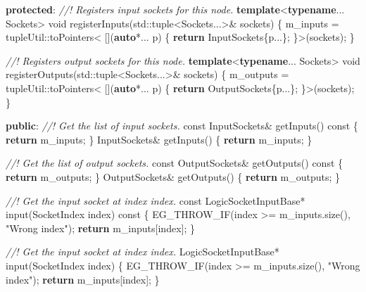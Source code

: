 \documentclass[
  12pt,
  british,
  a4paper,
  twoside,
  titlepage,
  openright,
  numbers=noenddot,
  chapterprefix=true,
  headings=optiontohead,
  svgnames,
  dvipsnames]{scrreprt}
\newenvironment{Shaded}{}{}
\newcommand{\AttributeTok}[1]{\textcolor[rgb]{0.49,0.56,0.16}{#1}}
\newcommand{\BuiltInTok}[1]{#1}
\newcommand{\CommentTok}[1]{\textcolor[rgb]{0.38,0.63,0.69}{\textit{#1}}}
\newcommand{\ControlFlowTok}[1]{\textcolor[rgb]{0.00,0.44,0.13}{\textbf{#1}}}
\newcommand{\DataTypeTok}[1]{\textcolor[rgb]{0.56,0.13,0.00}{#1}}
\newcommand{\KeywordTok}[1]{\textcolor[rgb]{0.00,0.44,0.13}{\textbf{#1}}}
\newcommand{\NormalTok}[1]{#1}
\newcommand{\StringTok}[1]{\textcolor[rgb]{0.25,0.44,0.63}{#1}}
\newcommand{\VariableTok}[1]{\textcolor[rgb]{0.10,0.09,0.49}{#1}}
\begin{document}
\begin{Shaded}
\begin{Highlighting}[numbers=left,,]
\KeywordTok{protected}\NormalTok{:}
    \CommentTok{//! Registers input sockets for this node.}
    \KeywordTok{template}\NormalTok{\textless{}}\KeywordTok{typename}\NormalTok{... Sockets\textgreater{}}
    \DataTypeTok{void}\NormalTok{ registerInputs(}\BuiltInTok{std::}\NormalTok{tuple\textless{}Sockets...\textgreater{}\& sockets)}
\NormalTok{    \{}
        \VariableTok{m\_inputs}\NormalTok{ = tupleUtil::toPointers\textless{}}
\NormalTok{            [](}\KeywordTok{auto}\NormalTok{*... p) \{ }\ControlFlowTok{return}\NormalTok{ InputSockets\{p...\}; \}\textgreater{}(sockets);}
\NormalTok{    \}}

    \CommentTok{//! Registers output sockets for this node.}
    \KeywordTok{template}\NormalTok{\textless{}}\KeywordTok{typename}\NormalTok{... Sockets\textgreater{}}
    \DataTypeTok{void}\NormalTok{ registerOutputs(}\BuiltInTok{std::}\NormalTok{tuple\textless{}Sockets...\textgreater{}\& sockets)}
\NormalTok{    \{}
        \VariableTok{m\_outputs}\NormalTok{ = tupleUtil::toPointers\textless{}}
\NormalTok{            [](}\KeywordTok{auto}\NormalTok{*... p) \{ }\ControlFlowTok{return}\NormalTok{ OutputSockets\{p...\}; \}\textgreater{}(sockets);}
\NormalTok{    \}}

\KeywordTok{public}\NormalTok{:}
    \CommentTok{//! Get the list of input sockets.}
    \AttributeTok{const}\NormalTok{ InputSockets\& getInputs() }\AttributeTok{const}\NormalTok{ \{ }\ControlFlowTok{return} \VariableTok{m\_inputs}\NormalTok{; \}}
\NormalTok{    InputSockets\& getInputs() \{ }\ControlFlowTok{return} \VariableTok{m\_inputs}\NormalTok{; \}}

    \CommentTok{//! Get the list of output sockets.}
    \AttributeTok{const}\NormalTok{ OutputSockets\& getOutputs() }\AttributeTok{const}\NormalTok{ \{ }\ControlFlowTok{return} \VariableTok{m\_outputs}\NormalTok{; \}}
\NormalTok{    OutputSockets\& getOutputs() \{ }\ControlFlowTok{return} \VariableTok{m\_outputs}\NormalTok{; \}}

    \CommentTok{//! Get the input socket at index \textasciigrave{}index\textasciigrave{}.}
    \AttributeTok{const}\NormalTok{ LogicSocketInputBase* input(SocketIndex index) }\AttributeTok{const}
\NormalTok{    \{}
\NormalTok{        EG\_THROW\_IF(index \textgreater{}= }\VariableTok{m\_inputs}\NormalTok{.size(), }\StringTok{"Wrong index"}\NormalTok{);}
        \ControlFlowTok{return} \VariableTok{m\_inputs}\NormalTok{[index];}
\NormalTok{    \}}

    \CommentTok{//! Get the input socket at index \textasciigrave{}index\textasciigrave{}.}
\NormalTok{    LogicSocketInputBase* input(SocketIndex index)}
\NormalTok{    \{}
\NormalTok{        EG\_THROW\_IF(index \textgreater{}= }\VariableTok{m\_inputs}\NormalTok{.size(), }\StringTok{"Wrong index"}\NormalTok{);}
        \ControlFlowTok{return} \VariableTok{m\_inputs}\NormalTok{[index];}
\NormalTok{    \}}


\end{Highlighting}
\end{Shaded}
\end{document}
